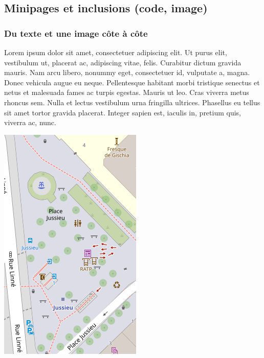 \subsection{Minipages et inclusions (code, image)}
\begin{frame}
  \frametitle{Du texte et une image côte à côte}
  
  \begin{minipage}{0.56\textwidth}
    Lorem ipsum dolor sit amet, consectetuer adipiscing elit. 
    Ut purus elit, vestibulum ut, placerat ac, adipiscing vitae, felis. 
    Curabitur dictum gravida mauris. 
    Nam arcu libero, nonummy eget, consectetuer id, vulputate a, magna. 
    Donec vehicula augue eu neque. 
    Pellentesque habitant morbi tristique senectus et netus et malesuada fames ac turpis egestas. 
    Mauris ut leo. Cras viverra metus rhoncus sem. 
    Nulla et lectus vestibulum urna fringilla ultrices.
    Phasellus eu tellus sit amet tortor gravida placerat. Integer sapien est,
    iaculis in, pretium quis, viverra ac, nunc.
  \end{minipage}
  \hfill
  \begin{minipage}{0.38\textwidth}
    \includegraphics[scale=0.45]{pour_exemples/mini_plan.png}
  \end{minipage}
\end{frame}

